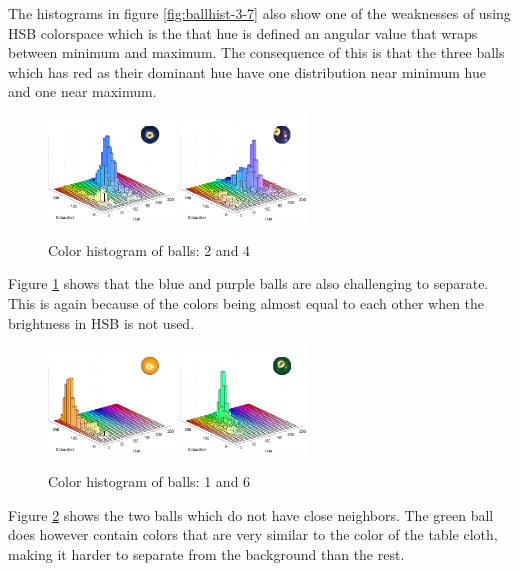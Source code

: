 The histograms in figure \ref{fig:ballhist-3-7} also show one of the weaknesses of using HSB colorspace which is the that hue is defined an angular value that wraps between minimum and maximum. The consequence of this is that the three  balls which has red as their dominant hue have one distribution near minimum hue and one near maximum.
\begin{figure}[H]
\centering
\subfloat
{
	\includegraphics[width=0.3\textwidth]{images/ballhist/2}
}
\subfloat
{
	\includegraphics[width=0.3\textwidth]{images/ballhist/4}
}
\caption{Color histogram of balls: 2 and 4}
\label{fig:ballhist-2-4}
\end{figure}
Figure \ref{fig:ballhist-2-4} shows that the blue and purple balls are also challenging to separate. This is again because of the colors being almost equal to each other when the brightness in HSB is not used.

\begin{figure}[H]
\centering
\subfloat
{
	\includegraphics[width=0.3\textwidth]{images/ballhist/1}
}
\subfloat
{
	\includegraphics[width=0.3\textwidth]{images/ballhist/6}
}
\caption{Color histogram of balls: 1 and 6}
\label{fig:ballhist-1-6}
\end{figure} 
Figure \ref{fig:ballhist-1-6} shows the two balls which do not have close neighbors. The green ball does however contain colors that are very similar to the color of the table cloth, making it harder to separate from the background than the rest.

